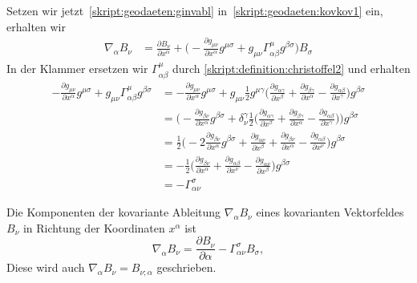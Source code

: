 Setzen wir jetzt~\eqref{skript:geodaeten:ginvabl}
in~\eqref{skript:geodaeten:kovkov1} ein, erhalten wir
\begin{align*}
\nabla_\alpha B_\nu
&=
\frac{\partial B_\nu}{\partial x^\alpha}
+
\biggl(
-\frac{\partial g_{\mu\nu}}{\partial x^\alpha} g^{\mu\sigma}
+
g_{\mu\nu}
\Gamma^\mu_{\alpha\beta}g^{\beta\sigma}
\biggr)B_\sigma
\end{align*}
In der Klammer ersetzen wir $\Gamma^\mu_{\alpha\beta}$ durch
\eqref{skript:definition:christoffel2} und erhalten
\begin{align*}
-\frac{\partial g_{\mu\nu}}{\partial x^\alpha} g^{\mu\sigma}
+
g_{\mu\nu}
\Gamma^\mu_{\alpha\beta}
g^{\beta\sigma}
&=
-\frac{\partial g_{\mu\nu}}{\partial x^\alpha} g^{\mu\sigma}
+
g_{\mu\nu}
\frac12
g^{\mu\gamma}
\biggl(
\frac{\partial g_{\alpha\gamma}}{\partial x^\beta}
+
\frac{\partial g_{\beta\gamma}}{\partial x^\alpha}
-
\frac{\partial g_{\alpha\beta}}{\partial x^\gamma}
\biggr)
g^{\beta\sigma}
\\
&=
\biggl(
-\frac{\partial g_{\beta\nu}}{\partial x^\alpha} g^{\beta\sigma}
+
\delta_\nu^\gamma
\frac12
\biggl(
\frac{\partial g_{\alpha\gamma}}{\partial x^\beta}
+
\frac{\partial g_{\beta\gamma}}{\partial x^\alpha}
-
\frac{\partial g_{\alpha\beta}}{\partial x^\gamma}
\biggr)
\biggr)
g^{\beta\sigma}
\\
&=
\frac12
\biggl(
-2\frac{\partial g_{\beta\nu}}{\partial x^\alpha} g^{\beta\sigma}
+
\frac{\partial g_{\alpha\nu}}{\partial x^\beta}
+
\frac{\partial g_{\beta\nu}}{\partial x^\alpha}
-
\frac{\partial g_{\alpha\beta}}{\partial x^\nu}
\biggr)
g^{\beta\sigma}
\\
&=
-\frac12
\biggl(
\frac{\partial g_{\beta\nu}}{\partial x^\alpha}
+
\frac{\partial g_{\alpha\beta}}{\partial x^\nu}
-
\frac{\partial g_{\alpha\nu}}{\partial x^\beta}
\biggr)
g^{\beta\sigma}
\\
&=-\Gamma^\sigma_{\alpha\nu}
\end{align*}
\begin{definition}
Die Komponenten der kovariante Ableitung $\nabla_\alpha B_\nu$ eines
kovarianten Vektorfeldes $B_\nu$ in Richtung der Koordinaten $x^\alpha$
ist
\begin{equation}
\nabla_\alpha B_\nu
=
\frac{\partial B_\nu}{\partial\alpha}
-\Gamma^{\sigma}_{\alpha\nu}B_\sigma,
\label{skript:geodaeten:kovabl2}
\end{equation}
Diese wird auch $\nabla_\alpha B_\nu=B_{\nu;\alpha}$ geschrieben.
\end{definition}

